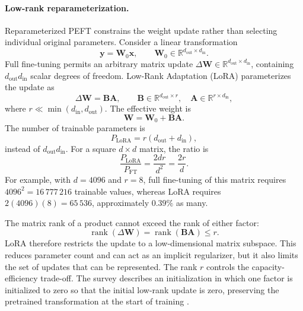 \paragraph{Low-rank reparameterization.}
Reparameterized PEFT constrains the weight update rather than selecting
individual original parameters. Consider a linear transformation
\begin{equation}
    \mathbf{y}
    =
    \mathbf{W}_0\mathbf{x},
    \qquad
    \mathbf{W}_0
    \in
    \mathbb{R}^{d_{\mathrm{out}}\times d_{\mathrm{in}}}.
    \label{eq:peft-linear-base}
\end{equation}
Full fine-tuning permits an arbitrary matrix update
$\Delta\mathbf{W}\in
\mathbb{R}^{d_{\mathrm{out}}\times d_{\mathrm{in}}}$, containing
$d_{\mathrm{out}}d_{\mathrm{in}}$ scalar degrees of freedom. Low-Rank
Adaptation (LoRA) parameterizes the update as
\begin{equation}
    \Delta\mathbf{W}
    =
    \mathbf{B}\mathbf{A},
    \qquad
    \mathbf{B}\in\mathbb{R}^{d_{\mathrm{out}}\times r},
    \quad
    \mathbf{A}\in\mathbb{R}^{r\times d_{\mathrm{in}}},
    \label{eq:peft-lora-factorization}
\end{equation}
where $r\ll\min(d_{\mathrm{in}},d_{\mathrm{out}})$. The effective weight is
\begin{equation}
    \mathbf{W}
    =
    \mathbf{W}_0+\mathbf{B}\mathbf{A}.
    \label{eq:peft-lora-weight}
\end{equation}
The number of trainable parameters is
\begin{equation}
    P_{\mathrm{LoRA}}
    =
    r(d_{\mathrm{out}}+d_{\mathrm{in}}),
    \label{eq:peft-lora-parameters}
\end{equation}
instead of $d_{\mathrm{out}}d_{\mathrm{in}}$. For a square $d\times d$
matrix, the ratio is
\begin{equation}
    \frac{P_{\mathrm{LoRA}}}{P_{\mathrm{FT}}}
    =
    \frac{2dr}{d^2}
    =
    \frac{2r}{d}.
    \label{eq:peft-lora-ratio}
\end{equation}
For example, with $d=4096$ and $r=8$, full fine-tuning of this matrix requires
$4096^2=16\,777\,216$ trainable values, whereas LoRA requires
$2(4096)(8)=65\,536$, approximately $0.39\%$ as many.

The matrix rank of a product cannot exceed the rank of either factor:
\begin{equation}
    \operatorname{rank}(\Delta\mathbf{W})
    =
    \operatorname{rank}(\mathbf{B}\mathbf{A})
    \leq r.
    \label{eq:peft-lora-rank}
\end{equation}
LoRA therefore restricts the update to a low-dimensional matrix subspace.
This reduces parameter count and can act as an implicit regularizer, but it
also limits the set of updates that can be represented. The rank $r$ controls
the capacity-efficiency trade-off. The survey describes an initialization in
which one factor is initialized to zero so that the initial low-rank update
is zero, preserving the pretrained transformation at the start of training
\parencite{prottasha2025peft}.

